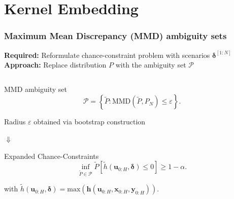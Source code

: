 \documentclass[student, noshadow, itr, english, aspectratio=169]{ITR_LSR_slides}
\begin{document}
\section{Kernel Embedding}

\begin{frame}
	\frametitle{Maximum Mean Discrepancy (MMD) ambiguity sets}
\textbf{Required:} Reformulate chance-constraint problem with scenarios $\boldsymbol{\delta}^{[1:N]}$\\
\textbf{Approach:} Replace distribution $P$ with the ambiguity set $\mathcal{P}$\\

\begin{columns}[onlytextwidth, T]
\begin{column}{.65\textwidth}

\begin{block}{MMD ambiguity set}
\begin{equation*}
\mathcal{P} =  \left\{ \tilde{P} : \text{MMD} (\tilde{P}, P_N) \leq \varepsilon \right\}.
\end{equation*}
\end{block}	

Radius $\varepsilon$ obtained via bootstrap construction 

\makebox[4.2cm]{\hfill} $\boldsymbol{\Downarrow}$ 

\begin{block}{Expanded Chance-Constraints}
\begin{equation*}
\inf\limits_{\tilde{P} \in \mathcal{P}}\tilde{P} \left[ \tilde{h}(\boldsymbol{u}_{0:H},  \boldsymbol{\delta}) \leq 0 \right] \geq 1 - \alpha.
\end{equation*}
\end{block}

with $\tilde{h}(\boldsymbol{u}_{0:H},  \boldsymbol{\delta})  =  \text{max}(\boldsymbol{h}(\boldsymbol{u}_{0:H},  \boldsymbol{x}_{0:H},  \boldsymbol{y}_{0:H}))$.


\end{column}
\end{columns}
\end{frame}
\end{document}
